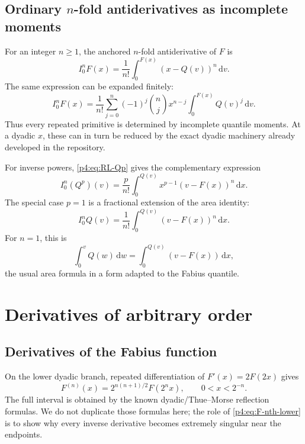 \documentclass[11pt,oneside]{article}
\theoremstyle{definition}
\theoremstyle{remark}
\newcommand{\F}{F}
\newcommand{\Q}{Q}
\newcommand{\dd}{\,\mathrm d}
\newcommand{\1}{\mathbf 1}
\begin{document}
\subsection{Ordinary \(n\)-fold antiderivatives as incomplete moments}

For an integer \(n\ge1\), the anchored \(n\)-fold antiderivative of \(\F\) is
\begin{equation}\label{p4:eq:nth-F-primitive}
 I_0^n\F(x)=\frac1{n!}
 \int_0^{\F(x)}(x-\Q(v))^n\dd v.
\end{equation}
The same expression can be expanded finitely:
\begin{equation}\label{p4:eq:nth-F-incomplete-moments}
 I_0^n\F(x)
 =\frac1{n!}\sum_{j=0}^n(-1)^j\binom njx^{n-j}
 \int_0^{\F(x)}\Q(v)^j\dd v.
\end{equation}
Thus every repeated primitive is determined by incomplete quantile moments.  At a dyadic
\(x\), these can in turn be reduced by the exact dyadic machinery already developed in
the repository.

For inverse powers, \cref{p4:eq:RL-Qp} gives the complementary expression
\begin{equation}\label{p4:eq:nth-Q-primitive}
 I_0^n(\Q^p)(v)
 =\frac{p}{n!}\int_0^{\Q(v)}x^{p-1}(v-\F(x))^n\dd x.
\end{equation}
The special case \(p=1\) is a fractional extension of the area identity:
\begin{equation}\label{p4:eq:nth-Q-area}
 I_0^n\Q(v)=\frac1{n!}\int_0^{\Q(v)}(v-\F(x))^n\dd x.
\end{equation}
For \(n=1\), this is
\begin{equation}\label{p4:eq:classic-inverse-area}
 \int_0^v\Q(w)\dd w=\int_0^{\Q(v)}(v-\F(x))\dd x,
\end{equation}
the usual area formula in a form adapted to the Fabius quantile.

\section{Derivatives of arbitrary order}

\subsection{Derivatives of the Fabius function}

On the lower dyadic branch, repeated differentiation of
\(\F'(x)=2\F(2x)\) gives
\begin{equation}\label{p4:eq:F-nth-lower}
 \F^{(n)}(x)=2^{n(n+1)/2}\F(2^nx),
 \qquad 0<x<2^{-n}.
\end{equation}
The full interval is obtained by the known dyadic/Thue--Morse reflection formulas.
We do not duplicate those formulas here; the role of \cref{p4:eq:F-nth-lower} is to show
why every inverse derivative becomes extremely singular near the endpoints.
\end{document}
